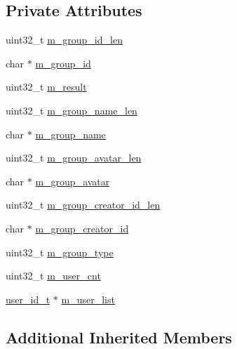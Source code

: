 \subsection*{Private Attributes}
\begin{DoxyCompactItemize}
\item 
uint32\+\_\+t \hyperlink{class_c_im_pdu_client_group_user_list_response_a7b8fbdb5a93d62feda0e6a0190916a35}{m\+\_\+group\+\_\+id\+\_\+len}
\item 
char $\ast$ \hyperlink{class_c_im_pdu_client_group_user_list_response_a683cb3c6782cac7a3c0307f963143ca0}{m\+\_\+group\+\_\+id}
\item 
uint32\+\_\+t \hyperlink{class_c_im_pdu_client_group_user_list_response_a5a3f3fe7879e15ca5d0e23a28e0eb059}{m\+\_\+result}
\item 
uint32\+\_\+t \hyperlink{class_c_im_pdu_client_group_user_list_response_adfa3c8bd3b663b45eb83bde802f918cc}{m\+\_\+group\+\_\+name\+\_\+len}
\item 
char $\ast$ \hyperlink{class_c_im_pdu_client_group_user_list_response_aa7d45de22e4a7390b20ac8434faa1760}{m\+\_\+group\+\_\+name}
\item 
uint32\+\_\+t \hyperlink{class_c_im_pdu_client_group_user_list_response_a6f85b080185b4b6bb053933fb3f735dd}{m\+\_\+group\+\_\+avatar\+\_\+len}
\item 
char $\ast$ \hyperlink{class_c_im_pdu_client_group_user_list_response_a5a07d05ed355d1cfdd189294cdba1355}{m\+\_\+group\+\_\+avatar}
\item 
uint32\+\_\+t \hyperlink{class_c_im_pdu_client_group_user_list_response_a2f5f4684d6a9b121f96fed52b6b458e0}{m\+\_\+group\+\_\+creator\+\_\+id\+\_\+len}
\item 
char $\ast$ \hyperlink{class_c_im_pdu_client_group_user_list_response_ad5036428dab732cf61110698601f719c}{m\+\_\+group\+\_\+creator\+\_\+id}
\item 
uint32\+\_\+t \hyperlink{class_c_im_pdu_client_group_user_list_response_a8f75a8ebaca9537aa26c7b1ac52200df}{m\+\_\+group\+\_\+type}
\item 
uint32\+\_\+t \hyperlink{class_c_im_pdu_client_group_user_list_response_a86be9b901f816f9c42447bf33be49b8a}{m\+\_\+user\+\_\+cnt}
\item 
\hyperlink{structuser__id__t}{user\+\_\+id\+\_\+t} $\ast$ \hyperlink{class_c_im_pdu_client_group_user_list_response_a75c6582909b6c35fc9d48d1b859ee660}{m\+\_\+user\+\_\+list}
\end{DoxyCompactItemize}
\subsection*{Additional Inherited Members}


